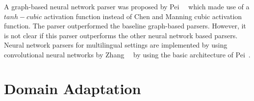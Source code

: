 A graph-based neural network parser was proposed by Pei~\etal~\cite{pei2015effective} which made use of a $tanh-cubic$ activation function instead of Chen and Manning cubic activation function. The parser outperformed the baseline graph-based parsers. However, it is not clear if this parser outperforms the other neural network based parsers. Neural network parsers for multilingual settings are implemented by using convolutional neural networks by Zhang~\etal~\cite{zhang2016probabilistic} by using the basic architecture of Pei~\etal.


\section{Domain Adaptation}